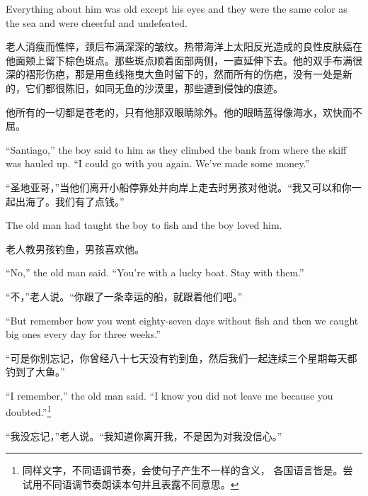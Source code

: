 \begin{paracol}{2}
Everything about him was old \gls{except} his eyes and they were the same
color as the sea and were \gls{cheerful} and \gls{undefeated}.

\switchcolumn

老人消瘦而憔悴，颈后布满深深的皱纹。热带海洋上太阳反光造成的良性皮肤癌在他面颊上留下棕色斑点。那些斑点顺着面部两侧，一直延伸下去。他的双手布满很深的褶形伤疤，那是用鱼线拖曳大鱼时留下的，然而所有的伤疤，没有一处是新的，它们都很陈旧，如同无鱼的沙漠里，那些遭到侵蚀的痕迹。

他所有的一切都是苍老的，只有他那双眼睛除外。他的眼睛蓝得像海水，欢快而不屈。

\switchcolumn*

``Santiago,'' the boy said to him as they climbed the \gls{bank} from where the
skiff was \gls{hauled} up. ``I could go with you again. We've made some money.''

\switchcolumn

“圣地亚哥，”当他们离开小船停靠处并向岸上走去时男孩对他说。“我又可以和你一起出海了。我们有了点钱。”

\switchcolumn*

The old man had taught the boy to fish and the boy loved him.

\switchcolumn

老人教男孩钓鱼，男孩喜欢他。

\switchcolumn*

``No,'' the old man said. ``You're with a lucky boat. Stay with them.''

\switchcolumn

“不，”老人说。“你跟了一条幸运的船，就跟着他们吧。”

\switchcolumn*

``But remember how you went eighty-seven days without fish and then we caught big ones every day for three weeks.''

\switchcolumn

“可是你别忘记，你曾经八十七天没有钓到鱼，然后我们一起连续三个星期每天都钓到了大鱼。”

\switchcolumn*

``I remember,'' the old man said. ``I know you did not leave me because you
\gls{doubted}.''\footnote{同样文字，不同语调节奏，会使句子产生不一样的含义，
  各国语言皆是。尝试用不同语调节奏朗读本句并且表露不同意思。}

\switchcolumn

“我没忘记，”老人说。“我知道你离开我，不是因为对我没信心。”

\switchcolumn*


\end{paracol}
